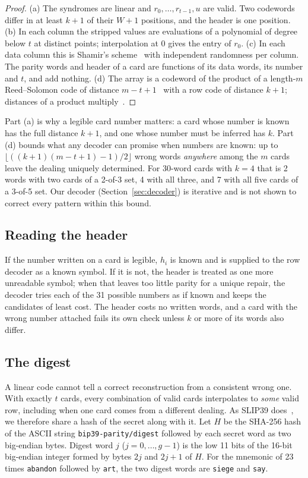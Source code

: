 \documentclass[numeric]{anvil-paper}
\newcommand{\code}[1]{\texttt{#1}}
\begin{document}
\begin{proof}
(a) The syndromes are linear and $r_0,\dots,r_{t-1},u$ are valid. Two codewords
differ in at least $k+1$ of their $W+1$ positions, and the header is one
position.
(b) In each column the stripped values are evaluations of a polynomial of
degree below $t$ at distinct points; interpolation at $0$ gives the entry of
$r_0$.
(c) In each data column this is Shamir's scheme~\citep{shamir1979how} with
independent randomness per column. The parity words and header of a card are
functions of its data words, its number and $t$, and add nothing.
(d) The array is a codeword of the product of a length-$m$ Reed--Solomon code
of distance $m-t+1$~\citep{mceliece1981sharing} with a row code of distance
$k+1$; distances of a product multiply~\citep{elias1954error}.
\end{proof}

Part (a) is why a legible card number matters: a card whose number is known has
the full distance $k+1$, and one whose number must be inferred has $k$. Part
(d) bounds what any decoder can promise when numbers are known: up to
$\lfloor((k+1)(m-t+1)-1)/2\rfloor$ wrong words \emph{anywhere} among the $m$
cards leave the dealing uniquely determined. For 30-word cards with $k=4$ that
is 2 words with two cards of a 2-of-3 set, 4 with all three, and 7 with all
five cards of a 3-of-5 set. Our decoder (Section~\ref{sec:decoder}) is
iterative and is not shown to correct every pattern within this bound.

\subsection{Reading the header}

If the number written on a card is legible, $h_i$ is known and is supplied to
the row decoder as a known symbol. If it is not, the header is treated as one
more unreadable symbol; when that leaves too little parity for a unique
repair, the decoder tries each of the 31 possible numbers as if known and keeps
the candidates of least cost. The header costs no written words, and a card
with the wrong number attached fails its own check unless $k$ or more of its
words also differ.

\subsection{The digest}
\label{sec:digest}

A linear code cannot tell a correct reconstruction from a consistent wrong one.
With exactly $t$ cards, every combination of valid cards interpolates to
\emph{some} valid row, including when one card comes from a different dealing.
As SLIP39 does~\citep{slip39}, we therefore share a hash of the secret along
with it. Let $H$ be the SHA-256 hash of the ASCII string
\code{bip39-parity/digest} followed by each secret word as two big-endian
bytes. Digest word $j$ ($j=0,\dots,g-1$) is the low 11 bits of the 16-bit
big-endian integer formed by bytes $2j$ and $2j+1$ of $H$. For the mnemonic of
23 times \code{abandon} followed by \code{art}, the two digest words are
\code{siege} and \code{say}.
\end{document}
